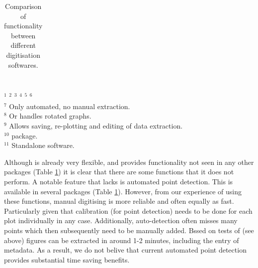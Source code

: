 \documentclass[article]{jss}
\begin{document}
\begin{table}
{\begin{tabular}{lccccccc}

\end{tabular}
}
{\footnotesize
\\
$^1$ \citet{GraphClick}
$^2$ \citet{DataThief}
$^3$ \citet{DigitizeIt}
$^4$ \citet{WebPlotDigitizer}
$^5$ \citet{Lajeunesse2016}
$^6$ \citet{Poisot2011}
\\$^7$ Only automated, no manual extraction.
\\$^8$ Or handles rotated graphs. 
\\$^9$ Allows saving, re-plotting and editing of data extraction.
\\$^{10}$  package.
\\$^{11}$ Standalone software.
}

\caption{\label{tab:comparison} Comparison of functionality between different digitisation softwares.}

\end{table}



Although  is already very flexible, and provides functionality not seen in any other packages (Table \ref{tab:comparison}) it is clear that there are some functions that it does not perform. A notable feature that  lacks is automated point detection. This is available in several packages (Table \ref{tab:comparison}). However, from our experience of using these functions, manual digitising is more reliable and often equally as fast. Particularly given that calibration (for point detection) needs to be done for each plot individually in any case. Additionally, auto-detection often misses many points which then subsequently need to be manually added. Bssed on tests of  (see above) figures can be extracted in around 1-2 minutes, including the entry of metadata. As a result, we do not belive that current automated point detection provides substantial time saving benefits.
\end{document}
